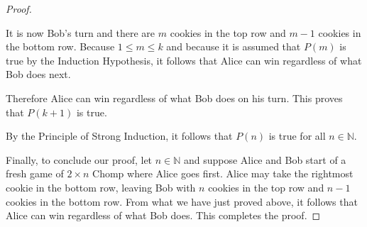 \documentclass[11pt]{article}
\theoremstyle{plain}
\theoremstyle{plain}
\theoremstyle{remark}
\def\naturals{\mathbb{N}}
\begin{document}
\begin{proof}
\begin{itemize}
\begin{itemize}
\begin{center}
\end{center}
It is now Bob's turn and there are $m$ cookies in the top row and $m-1$ cookies in the bottom row. Because $1\leq m\leq k$ and because it is assumed that $P(m)$ is true by the Induction Hypothesis, it follows that Alice can win regardless of what Bob does next. 
\end{itemize}
Therefore Alice can win regardless of what Bob does on his turn. This proves that $P(k+1)$ is true. 
\end{itemize}
By the Principle of Strong Induction, it follows that $P(n)$ is true for all $n\in\naturals$.

Finally, to conclude our proof, let $n\in\naturals$ and suppose Alice and Bob start of a fresh game of $2\times n$ Chomp where Alice goes first. Alice may take the rightmost cookie in the bottom row, leaving Bob with $n$ cookies in the top row and $n-1$ cookies in the bottom row. From what we have just proved above, it follows that Alice can win regardless of what Bob does. This completes the proof.
\end{proof}
\end{document}
